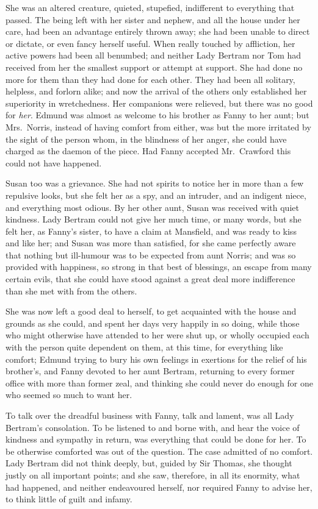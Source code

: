 She was an altered creature, quieted, stupefied, indifferent to
everything that passed.  The being left with her sister
and nephew, and all the house under her care, had been
an advantage entirely thrown away; she had been unable
to direct or dictate, or even fancy herself useful.
When really touched by affliction, her active powers
had been all benumbed; and neither Lady Bertram nor Tom
had received from her the smallest support or attempt
at support.  She had done no more for them than they
had done for each other.  They had been all solitary,
helpless, and forlorn alike; and now the arrival of the
others only established her superiority in wretchedness.
Her companions were relieved, but there was no good
for \emph{her}.  Edmund was almost as welcome to his brother
as Fanny to her aunt; but Mrs.\ Norris, instead of having
comfort from either, was but the more irritated by the
sight of the person whom, in the blindness of her anger,
she could have charged as the daemon of the piece.
Had Fanny accepted Mr.\ Crawford this could not have happened.

Susan too was a grievance.  She had not spirits to notice
her in more than a few repulsive looks, but she felt
her as a spy, and an intruder, and an indigent niece,
and everything most odious.  By her other aunt, Susan was
received with quiet kindness.  Lady Bertram could not
give her much time, or many words, but she felt her,
as Fanny's sister, to have a claim at Mansfield,
and was ready to kiss and like her; and Susan was more
than satisfied, for she came perfectly aware that nothing
but ill-humour was to be expected from aunt Norris;
and was so provided with happiness, so strong in that
best of blessings, an escape from many certain evils,
that she could have stood against a great deal more
indifference than she met with from the others.

She was now left a good deal to herself, to get acquainted
with the house and grounds as she could, and spent her
days very happily in so doing, while those who might
otherwise have attended to her were shut up, or wholly
occupied each with the person quite dependent on them,
at this time, for everything like comfort; Edmund trying
to bury his own feelings in exertions for the relief
of his brother's, and Fanny devoted to her aunt Bertram,
returning to every former office with more than former zeal,
and thinking she could never do enough for one who seemed
so much to want her.

To talk over the dreadful business with Fanny, talk and lament,
was all Lady Bertram's consolation.  To be listened to and
borne with, and hear the voice of kindness and sympathy
in return, was everything that could be done for her.
To be otherwise comforted was out of the question.
The case admitted of no comfort.  Lady Bertram did not
think deeply, but, guided by Sir Thomas, she thought
justly on all important points; and she saw, therefore,
in all its enormity, what had happened, and neither
endeavoured herself, nor required Fanny to advise her,
to think little of guilt and infamy.

